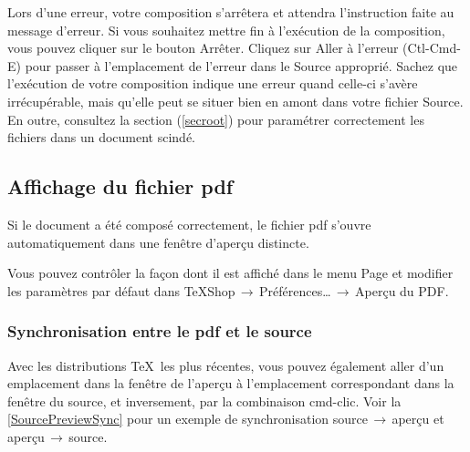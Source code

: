 \documentclass[11pt,french]{article}
\newcommand{\acr}[1]{\textsf{#1}}
\newcommand{\cmd}[1]{\textsf{#1}}
\newcommand{\mnu}[1]{\textsf{#1}}
\newcommand{\To}{\,\(\to\)\,}
\begin{document}
Lors d'une erreur, votre composition s'arrêtera et attendra l'instruction faite au message d'erreur. Si vous souhaitez mettre fin à l'exécution de la composition, vous pouvez cliquer sur le bouton \cmd{Arrêter}. Cliquez sur \cmd{Aller à l'erreur} (\cmd{Ctl-Cmd-E}) pour passer à l'emplacement de l'erreur dans le Source approprié. Sachez que l'exécution de votre composition indique une erreur quand celle-ci s'avère irrécupérable, mais qu'elle peut se situer bien en amont dans votre fichier Source. En outre, consultez la section (\ref{secroot}) pour paramétrer correctement les fichiers dans un document scindé. 

\subsection{Affichage du fichier \acr{pdf}}

Si le document a été composé correctement, le fichier \acr{pdf} s'ouvre automatiquement dans une fenêtre d'aperçu distincte.

Vous pouvez contrôler la façon dont il est affiché dans le menu \mnu{Page} et modifier les paramètres par défaut dans \mnu{TeXShop}\To\mnu{Préférences…}\To\mnu{Aperçu du PDF}.

%

\subsubsection{Synchronisation entre le \acr{pdf} et le source}

Avec les distributions \TeX\ les plus récentes, vous pouvez également aller d'un emplacement dans la fenêtre de l'aperçu à l'emplacement correspondant dans la fenêtre du source, et inversement, par la combinaison \cmd{cmd-clic}. Voir la \vref{SourcePreviewSync} pour un exemple de synchronisation source\To aperçu et aperçu\To source.
\end{document}
